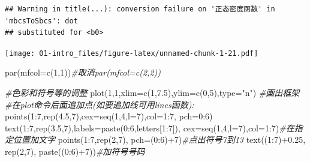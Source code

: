 \documentclass[
]{book}
\newenvironment{Shaded}{\begin{snugshade}}{\end{snugshade}}
\newcommand{\AttributeTok}[1]{\textcolor[rgb]{0.77,0.63,0.00}{#1}}
\newcommand{\CommentTok}[1]{\textcolor[rgb]{0.56,0.35,0.01}{\textit{#1}}}
\newcommand{\DecValTok}[1]{\textcolor[rgb]{0.00,0.00,0.81}{#1}}
\newcommand{\FloatTok}[1]{\textcolor[rgb]{0.00,0.00,0.81}{#1}}
\newcommand{\FunctionTok}[1]{\textcolor[rgb]{0.00,0.00,0.00}{#1}}
\newcommand{\NormalTok}[1]{#1}
\newcommand{\SpecialCharTok}[1]{\textcolor[rgb]{0.00,0.00,0.00}{#1}}
\newcommand{\StringTok}[1]{\textcolor[rgb]{0.31,0.60,0.02}{#1}}
\begin{document}
\begin{verbatim}
## Warning in title(...): conversion failure on '正态密度函数' in 'mbcsToSbcs': dot
## substituted for <b0>
\end{verbatim}

\texttt{[image: 01-intro\_files/figure-latex/unnamed-chunk-1-21.pdf]}

\begin{Shaded}
\begin{Highlighting}[]
\FunctionTok{par}\NormalTok{(}\AttributeTok{mfcol=}\FunctionTok{c}\NormalTok{(}\DecValTok{1}\NormalTok{,}\DecValTok{1}\NormalTok{))}\CommentTok{\#取消par(mfcol=c(2,2))}

\CommentTok{\#色彩和符号等的调整}
\FunctionTok{plot}\NormalTok{(}\DecValTok{1}\NormalTok{,}\DecValTok{1}\NormalTok{,}\AttributeTok{xlim=}\FunctionTok{c}\NormalTok{(}\DecValTok{1}\NormalTok{,}\FloatTok{7.5}\NormalTok{),}\AttributeTok{ylim=}\FunctionTok{c}\NormalTok{(}\DecValTok{0}\NormalTok{,}\DecValTok{5}\NormalTok{),}\AttributeTok{type=}\StringTok{"n"}\NormalTok{) }\CommentTok{\#画出框架}
\CommentTok{\#在plot命令后面追加点(如要追加线可用lines函数):}
\FunctionTok{points}\NormalTok{(}\DecValTok{1}\SpecialCharTok{:}\DecValTok{7}\NormalTok{,}\FunctionTok{rep}\NormalTok{(}\FloatTok{4.5}\NormalTok{,}\DecValTok{7}\NormalTok{),}\AttributeTok{cex=}\FunctionTok{seq}\NormalTok{(}\DecValTok{1}\NormalTok{,}\DecValTok{4}\NormalTok{,}\AttributeTok{l=}\DecValTok{7}\NormalTok{),}\AttributeTok{col=}\DecValTok{1}\SpecialCharTok{:}\DecValTok{7}\NormalTok{, }\AttributeTok{pch=}\DecValTok{0}\SpecialCharTok{:}\DecValTok{6}\NormalTok{)}
\FunctionTok{text}\NormalTok{(}\DecValTok{1}\SpecialCharTok{:}\DecValTok{7}\NormalTok{,}\FunctionTok{rep}\NormalTok{(}\FloatTok{3.5}\NormalTok{,}\DecValTok{7}\NormalTok{),}\AttributeTok{labels=}\FunctionTok{paste}\NormalTok{(}\DecValTok{0}\SpecialCharTok{:}\DecValTok{6}\NormalTok{,letters[}\DecValTok{1}\SpecialCharTok{:}\DecValTok{7}\NormalTok{]),}
\AttributeTok{cex=}\FunctionTok{seq}\NormalTok{(}\DecValTok{1}\NormalTok{,}\DecValTok{4}\NormalTok{,}\AttributeTok{l=}\DecValTok{7}\NormalTok{),}\AttributeTok{col=}\DecValTok{1}\SpecialCharTok{:}\DecValTok{7}\NormalTok{)}\CommentTok{\#在指定位置加文字}
\FunctionTok{points}\NormalTok{(}\DecValTok{1}\SpecialCharTok{:}\DecValTok{7}\NormalTok{,}\FunctionTok{rep}\NormalTok{(}\DecValTok{2}\NormalTok{,}\DecValTok{7}\NormalTok{), }\AttributeTok{pch=}\NormalTok{(}\DecValTok{0}\SpecialCharTok{:}\DecValTok{6}\NormalTok{)}\SpecialCharTok{+}\DecValTok{7}\NormalTok{)}\CommentTok{\#点出符号7到13}
\FunctionTok{text}\NormalTok{((}\DecValTok{1}\SpecialCharTok{:}\DecValTok{7}\NormalTok{)}\SpecialCharTok{+}\FloatTok{0.25}\NormalTok{, }\FunctionTok{rep}\NormalTok{(}\DecValTok{2}\NormalTok{,}\DecValTok{7}\NormalTok{), }\FunctionTok{paste}\NormalTok{((}\DecValTok{0}\SpecialCharTok{:}\DecValTok{6}\NormalTok{)}\SpecialCharTok{+}\DecValTok{7}\NormalTok{))}\CommentTok{\#加符号号码}

\end{Highlighting}
\end{Shaded}
\end{document}
